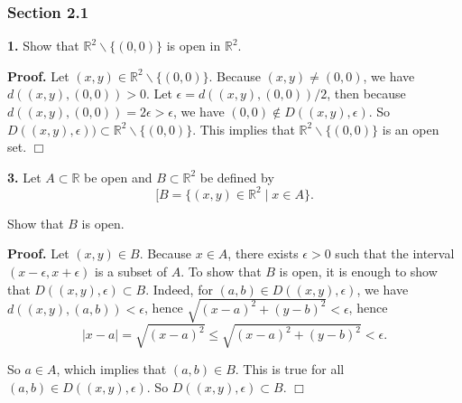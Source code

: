 \documentclass{article}
\begin{document}
    \subsubsection*{Section 2.1}\label{section-2.1}

    \textbf{1.} Show that $\mathbb{R}^2\backslash \{(0,0)\}$ is open in
$\mathbb{R}^2$.

\textbf{Proof.} Let $(x,y)\in \mathbb{R}^2\backslash \{(0,0)\}$. Because
$(x,y)\neq (0,0)$, we have $d((x,y),(0,0)) > 0$. Let
$\epsilon = d((x,y),(0,0))/2$, then because
$d((x,y), (0,0)) = 2\epsilon > \epsilon$, we have
$(0,0)\notin D((x,y),\epsilon)$. So
$D((x,y),\epsilon)) \subset \mathbb{R}^2\backslash \{(0,0)\}$. This
implies that $\mathbb{R}^2\backslash \{(0,0)\}$ is an open set. $\Box$

    \textbf{3.} Let $A \subset \mathbb{R}$ be open and
$B\subset \mathbb{R}^2$ be defined by
\[[ B = \{(x,y)\in\mathbb{R}^2 \mid x\in A\}.\]

Show that $B$ is open.

\textbf{Proof.} Let $(x,y)\in B$. Because $x\in A$, there exists
$\epsilon > 0$ such that the interval $(x-\epsilon, x+\epsilon)$ is a
subset of $A$. To show that $B$ is open, it is enough to show that
$D((x,y),\epsilon) \subset B$. Indeed, for $(a,b)\in D((x,y),\epsilon)$,
we have $d((x,y),(a,b)) < \epsilon$, hence
$\sqrt{(x-a)^2 +(y-b)^2} < \epsilon$, hence
\[|x-a|= \sqrt{(x-a)^2} \leq \sqrt{(x-a)^2 +(y-b)^2} < \epsilon.\]

So $a \in A$, which implies that $(a,b)\in B$. This is true for all
$(a,b) \in D((x,y),\epsilon)$. So $D((x,y),\epsilon) \subset B$. $\Box$


    
    
    
    
\end{document}
